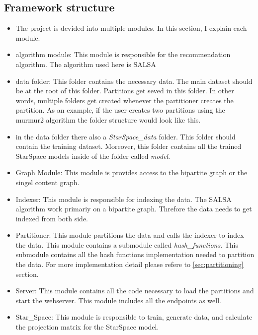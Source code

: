 \subsection{Framework structure}
\label{subsec:framework-structure}
\begin{itemize}
    \item The project is devided into multiple modules. In this section, I explain each module.
    \item algorithm module: This module is responsible for the recommendation algorithm. The algorithm used here is SALSA \cite{lempel2001salsa}
    \item data folder: This folder contains the necessary data. The main dataset should be at the root of this folder. Partitions get seved in this folder. In other words, multiple folders get created whenever the partitioner creates the partition. As an example, if the user creates two partitions using the murmur2 algorithm the folder structure would look like this.
    \item in the data folder there also a \emph{StarSpace\_data} folder. This folder should contain the training dataset. Moreover, this folder contains all the trained StarSpace models inside of the folder called \emph{model}.
    \item Graph Module: This module is provides access to the bipartite graph or the singel content graph.
    \item Indexer: This module is responsible for indexing the data. The SALSA algorithm work primariy on a bipartite graph. Threfore the data needs to get indexed from both side.
    \item Partitioner: This module partitions the data and calls the indexer to index the data. This module contains a submodule called \emph{hash\_functions}. This submodule contains all the hash functions implementation needed to partition the data. For more implementation detail please refere to \ref{sec:partitioning} section.
    \item Server: This module contains all the code necessary to load the partitions and start the webserver. This module includes all the endpoints as well.
    \item Star\_Space: This module is responsible to train, generate data, and calculate the projection matrix for the StarSpace model.
\end{itemize}


